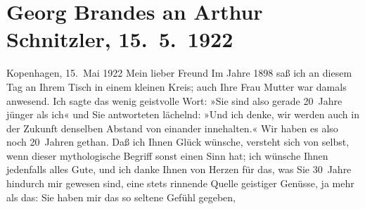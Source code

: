 

         
         \renewcommand{\erwaehntePersonen}{Personen:  ?? [Köchin von Georg Brandes], Louise Schnitzler,  Sokrates}
         \renewcommand{\erwaehnteOrte}{Orte: Athen, Frankreich, Griechenland, Griechisches Parlament, Izmir, Kopenhagen, Nationale und Kapodistrias-Universität Athen, Wien}
         \renewcommand{\erwaehnteWerke}{}
               \section[Georg Brandes an Arthur Schnitzler, 15. 5. 1922]{ Georg Brandes an Arthur Schnitzler, 15. 5. 1922}\nopagebreak{}\rehead{ }\begin{ledgroupsized}[t]{13cm}\normalsize\beginnumbering \toendnotes[C]{\smallbreak\pagebreak[2]} \toendnotes[C]{\smallbreak}\pstart
           \raggedleft{}{\pb}Kopenhagen, 15. Mai 1922\pend
           \pstart{}Mein lieber Freund\pend\pstart
           Im Jahre 1898 saß ich an diesem Tag an Ihrem Tisch in einem kleinen
               Kreis; auch Ihre Frau Mutter
               war damals anwesend. Ich sagte das wenig geistvolle Wort: »Sie sind also gerade
               20 Jahre jünger als ich« und Sie antworteten lächelnd: »Und ich denke, wir werden
               auch in der Zukunft denselben Abstand von einander innehalten.«\pend
           \pstart
           Wir haben es also noch 20 Jahren gethan. Daß ich Ihnen Glück wünsche, versteht sich
               von selbst, wenn dieser mythologische Begriff sonst einen Sinn hat; ich wünsche Ihnen
               jedenfalls alles Gute, und ich danke Ihnen von Herzen für das, was Sie 30 Jahre
               hindurch mir gewesen sind, eine stets rinnende Quelle geistiger Genüsse, ja mehr als
               das: Sie haben mir das so seltene Gefühl gegeben, \emph{\label{K_L02383_1v}}
\end{ledgroupsized}

